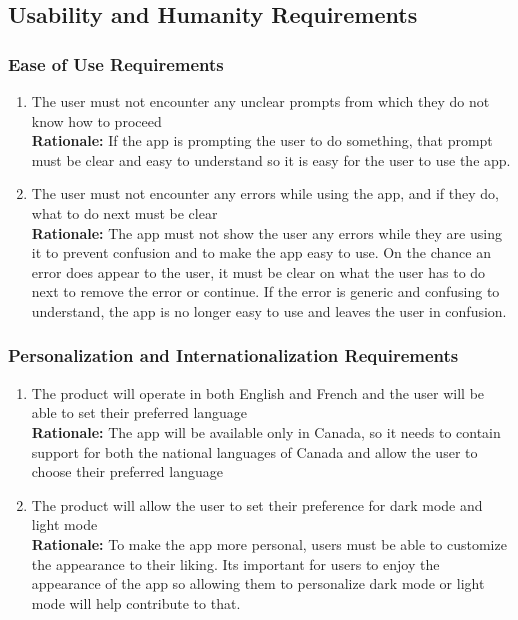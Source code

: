 \documentclass[]{article}
\begin{document}

\subsection{Usability and Humanity Requirements}
\label{sub:usability_and_humanity_requirements}

\subsubsection{Ease of Use Requirements}
\label{ssub:ease_of_use_requirements}
\begin{enumerate}[{UH-EOU}1. ]
	\item The user must not encounter any unclear prompts from which they do not know how to proceed \\
	{\bf Rationale:} If the app is prompting the user to do something, that prompt must be clear and easy to understand so it is easy for the user to use the app.
	\item The user must not encounter any errors while using the app, and if they do, what to do next must be clear \\
	{\bf Rationale:} The app must not show the user any errors while they are using it to prevent confusion and to make the app easy to use. On the chance an error does appear to the user, it must be clear on what the user has to do next to remove the error or continue. If the error is generic and confusing to understand, the app is no longer easy to use and leaves the user in confusion.
\end{enumerate}

\subsubsection{Personalization and Internationalization Requirements}
\label{ssub:personalization_and_internationalization_requirements}
\begin{enumerate}[{UH-PI}1. ]
	\item The product will operate in both English and French and the user will be able to set their preferred language \\
	{\bf Rationale:} The app will be available only in Canada, so it needs to contain support for both the national languages of Canada and allow the user to choose their preferred language
	\item The product will allow the user to set their preference for dark mode and light mode \\
	{\bf Rationale:} To make the app more personal, users must be able to customize the appearance to their liking. Its important for users to enjoy the appearance of the app so allowing them to personalize dark mode or light mode will help contribute to that.
\end{enumerate}
\end{document}
